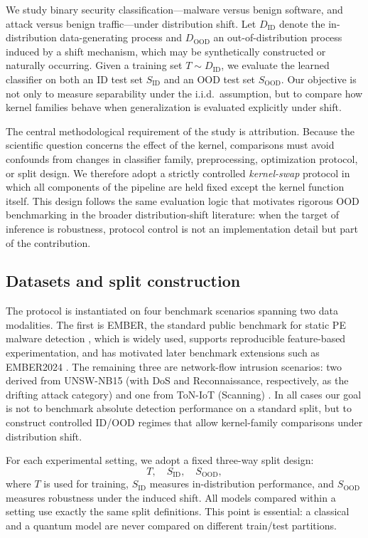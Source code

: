 \documentclass[journal]{IEEEtran}
\begin{document}
We study binary security classification---malware versus benign software, and attack versus benign traffic---under distribution shift. Let $D_{\mathrm{ID}}$ denote the in-distribution data-generating process and $D_{\mathrm{OOD}}$ an out-of-distribution process induced by a shift mechanism, which may be synthetically constructed or naturally occurring. Given a training set $T \sim D_{\mathrm{ID}}$, we evaluate the learned classifier on both an ID test set $S_{\mathrm{ID}}$ and an OOD test set $S_{\mathrm{OOD}}$. Our objective is not only to measure separability under the i.i.d.\ assumption, but to compare how kernel families behave when generalization is evaluated explicitly under shift.

The central methodological requirement of the study is attribution. Because the scientific question concerns the effect of the kernel, comparisons must avoid confounds from changes in classifier family, preprocessing, optimization protocol, or split design. We therefore adopt a strictly controlled \emph{kernel-swap} protocol in which all components of the pipeline are held fixed except the kernel function itself. This design follows the same evaluation logic that motivates rigorous OOD benchmarking in the broader distribution-shift literature: when the target of inference is robustness, protocol control is not an implementation detail but part of the contribution.

\subsection{Datasets and split construction}

The protocol is instantiated on four benchmark scenarios spanning two data modalities. The first is EMBER, the standard public benchmark for static PE malware detection \cite{anderson2018ember}, which is widely used, supports reproducible feature-based experimentation, and has motivated later benchmark extensions such as EMBER2024 \cite{joyce2025ember2024}. The remaining three are network-flow intrusion scenarios: two derived from UNSW-NB15 (with DoS and Reconnaissance, respectively, as the drifting attack category) \cite{moustafa2015unsw} and one from ToN-IoT (Scanning) \cite{alsaedi2020toniot}. In all cases our goal is not to benchmark absolute detection performance on a standard split, but to construct controlled ID/OOD regimes that allow kernel-family comparisons under distribution shift.

For each experimental setting, we adopt a fixed three-way split design:
\[
T,\quad S_{\mathrm{ID}},\quad S_{\mathrm{OOD}},
\]
where $T$ is used for training, $S_{\mathrm{ID}}$ measures in-distribution performance, and $S_{\mathrm{OOD}}$ measures robustness under the induced shift. All models compared within a setting use exactly the same split definitions. This point is essential: a classical and a quantum model are never compared on different train/test partitions.
\end{document}
